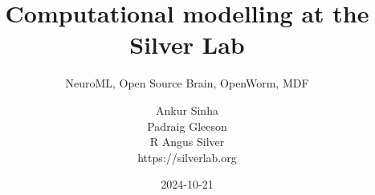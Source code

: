 \renewcommand{\figurename}{}


\renewcommand{\footnoterule}{}
\renewcommand*{\bibfont}{\tiny}

\title{Computational modelling at the Silver Lab}
\subtitle{NeuroML, Open Source Brain, OpenWorm, MDF}
\author[Ankur Sinha]{Ankur Sinha\\Padraig Gleeson\\R Angus Silver\\https://silverlab.org}
\date{2024-10-21}




\begin{frame}
  \titlepage{}
\end{frame}

